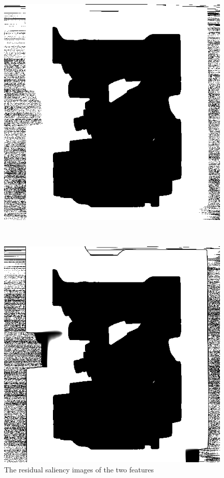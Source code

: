 \begin{figure}
	\centering
	\begin{minipage}{.33\textwidth}
		\includegraphics[width=1\linewidth]{images/engine_naive_leftgaussian_1}
	\end{minipage}~
	\begin{minipage}{.33\textwidth}
		\includegraphics[width=1\linewidth]{images/engine_naive_leftgaussian_2}
	\end{minipage}
	\caption{The residual saliency images of the two features}
	\label{fig:engine_naive_leftgaussian}
\end{figure}

